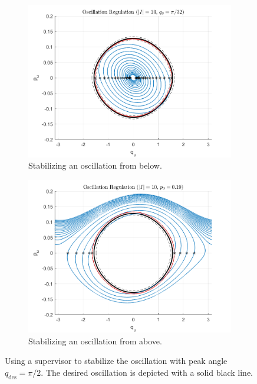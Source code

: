 \documentclass[journal,twoside,web, onecolumn, draftcls]{ieeecolor}
\begin{document}
\begin{figure}
    \centering
    \begin{subfigure}[t]{0.49\linewidth}
        \includegraphics[width=\linewidth]{acrobot_osc_orbit_1.png}
        \caption{Stabilizing an oscillation from below.}
        \label{fig:acrobot-osc-reg-in}
    \end{subfigure}
    \begin{subfigure}[t]{0.49\linewidth}
        \includegraphics[width=\linewidth]{acrobot_osc_orbit_2.png}
        \caption{Stabilizing an oscillation from above.}
        \label{fig:acrobot-osc-reg-diss}
    \end{subfigure}
    \caption{Using a supervisor to stabilize the oscillation with peak angle
    \(q_\text{des} = \pi/2\). The desired oscillation is depicted with a solid
    black line.}
    \label{fig:acrobot-osc-reg}
\end{figure}
\end{document}
